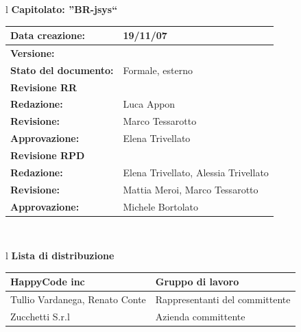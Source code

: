 \documentclass[11pt,titlepage,a4paper]{report}
\begin{document}
\begin{center}
\thispagestyle{plain}
\begin{table}[htbp]
\large{
\begin{tabular}{l}
\Large{\textbf{\textsf{Capitolato: ''BR-jsys``}}} \\
\begin{tabular}{||p{6cm}||p{6cm}||} \hline
\textbf{Data creazione:} & 19/11/07 \\ \hline
\textbf{Versione:} & \lv \\ \hline
\textbf{Stato del documento:} & Formale, esterno \\ \hline
\textbf{Revisione RR}     \\ \hline
\textbf{Redazione:} & Luca Appon \\ \hline
\textbf{Revisione:} & Marco Tessarotto   \\ \hline
\textbf{Approvazione:}  & Elena Trivellato \\ \hline
\textbf{Revisione RPD}     \\ \hline
\textbf{Redazione:} & Elena Trivellato, Alessia Trivellato \\ \hline
\textbf{Revisione:} & Mattia Meroi, Marco Tessarotto \\ \hline
\textbf{Approvazione:}  & Michele Bortolato \\ \hline

\end{tabular} \\
\end{tabular}
}
\end{table}

\begin{table}[hbtp]
\large{
\begin{tabular}{l}
\Large{\textbf{\textsf{Lista di distribuzione}}} \\
\begin{tabular}{||p{6cm}||p{6cm}||} \hline
{HappyCode inc}& Gruppo di lavoro\\ \hline
{Tullio Vardanega, Renato Conte}& Rappresentanti del committente \\ \hline
{Zucchetti S.r.l}& Azienda committente\\ \hline
\end{tabular} \\
\end{tabular}
}
\end{table}


\end{center}
\end{document}
